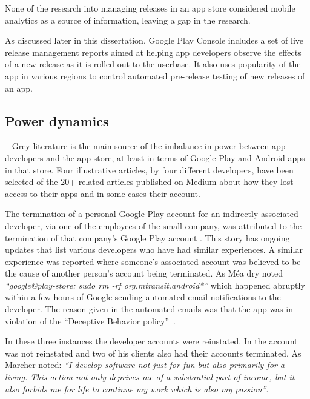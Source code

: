 None of the research into managing releases in an app store considered mobile analytics as a source of information, leaving a gap in the research.

As discussed later in this dissertation, Google Play Console includes a set of live release management reports aimed at helping app developers observe the effects of a new release as it is rolled out to the userbase. It also uses popularity of the app in various regions to control automated pre-release testing of new releases of an app. %

\subsection{Power dynamics}~\label{rw-power-dynamics-topic}
Grey literature is the main source of the imbalance in power between app developers and the app store, at least in terms of Google Play and Android apps in that store. Four illustrative articles, by four different developers, have been selected of the 20+ related articles published on \href{https://medium.com/}{Medium} %
about how they lost access to their apps and in some cases their account. 

The termination of a personal Google Play account for an indirectly associated developer, via one of the employees of the small company, was attributed to the termination of that company's Google Play account . This story has ongoing updates that list various developers who have had similar experiences. A similar experience was reported where someone's associated account was believed to be the cause of another person's account being terminated. As Méa dry noted \emph{``google@play-store: sudo rm -rf org.mtransit.android*''} which happened abruptly within a few hours of Google sending automated email notifications to the developer. The reason given in the automated emails was that the app was in violation of the ``Deceptive Behavior policy''~. 

In these three instances the developer accounts were reinstated. In \textcite{marcher2021_how_google_terminated-a-developer} the account was not reinstated and two of his clients also had their accounts terminated. As Marcher noted: \emph{``I develop software not just for fun but also primarily for a living. This action not only deprives me of a substantial part of income, but it also forbids me for life to continue my work which is also my passion''}. %

